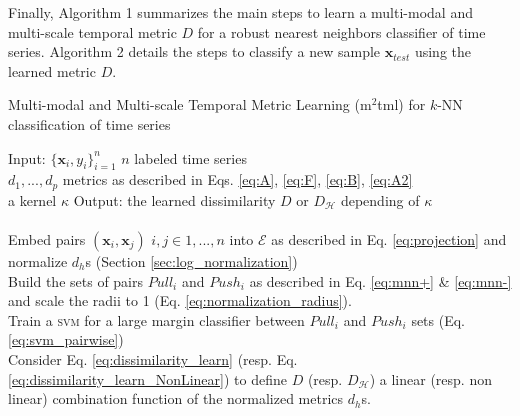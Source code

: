 \noindent Finally, Algorithm 1 summarizes the main steps to learn a multi-modal and multi-scale temporal metric $D$ for a robust nearest neighbors classifier of time series. Algorithm 2 details the steps to classify a new sample $\textbf{x}_{test}$ using the learned metric $D$.
\begin{algorithm}[h!]
	\begin{algorithmic}[1]
		\caption{Multi-modal and Multi-scale Temporal Metric Learning ({\sc m}$^2${\sc tml}) for $k$-NN classification of time series}
		\label{algo:MMTML}
		\STATE Input:  
		$\{\textbf{x}_i, y_i\}_{i=1}^n$ $n$ labeled time series \\ \hspace{1.1cm} $d_1, ...,d_p$  metrics as described in Eqs. \ref{eq:A}, \ref{eq:F}, \ref{eq:B}, \ref{eq:A2} \\
		\hspace{1.1cm} a kernel $\kappa$
		\STATE Output:  the learned dissimilarity $D$ or $D_{\mathcal{H}}$ depending of $\kappa$ \\
		 \\   
		Embed pairs $(\textbf{x}_i,\textbf{x}_j)$ $i,j \in {1,...,n}$ into $\mathcal{E}$ as described in Eq. \ref{eq:projection} and normalize $d_h$s (Section \ref{sec:log_normalization})
		 \\   
		Build the sets of pairs $Pull_i$ and $Push_i$ as described in Eq. \ref{eq:mnn+} \& \ref{eq:mnn-} and scale the radii to 1 (Eq. \ref{eq:normalization_radius}).
		 \\   
		Train a \textsc{svm} for a large margin classifier between  $Pull_i$ and $Push_i$ sets (Eq. \ref{eq:svm_pairwise})
		 \\ 
		Consider Eq. \ref{eq:dissimilarity_learn} (resp. Eq. \ref{eq:dissimilarity_learn_NonLinear}) to define $D$ (resp. $D_{\mathcal{H}}$) a linear (resp. non linear) combination function of the normalized metrics $d_h$s.
	\end{algorithmic}
\end{algorithm}


